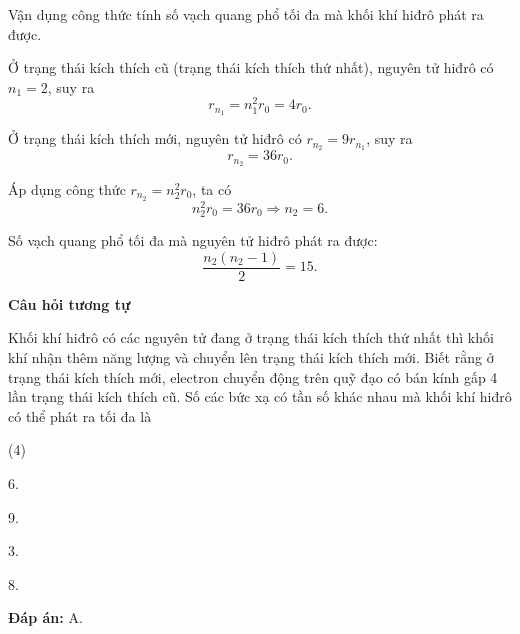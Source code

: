 \begin{dang}{Vận dụng công thức tính số vạch quang phổ tối đa mà khối khí hiđrô phát ra được.}
{Ở trạng thái kích thích cũ (trạng thái kích thích thứ nhất), nguyên tử hiđrô có $n_1= 2$, suy ra
\begin{equation*}
	r_{n_1} = n_1 ^2 r_0 = 4 r_0.
\end{equation*}

Ở trạng thái kích thích mới, nguyên tử hiđrô có $r_{n_2} = 9 r_{n_1}$, suy ra
\begin{equation*}
	r_{n _2} = 36 r_0.
\end{equation*}

Áp dụng công thức $r_{n_2} = n _2 ^2 r_0$, ta có
\begin{equation*}
	n _2 ^2 r_0 = 36 r_0 \Rightarrow n _2 = 6 .
\end{equation*}

Số vạch quang phổ tối đa mà nguyên tử hiđrô phát ra được:
\begin{equation*}
	\dfrac{n_2(n_2-1)}{2}=15.
\end{equation*}

	\begin{center}
	\textbf{Câu hỏi tương tự}
	\end{center}
	
Khối khí hiđrô có các nguyên tử đang ở trạng thái kích thích thứ nhất thì khối khí nhận thêm năng lượng và chuyển lên trạng thái kích thích mới. Biết rằng ở trạng thái kích thích mới, electron chuyển động trên quỹ đạo có bán kính gấp 4 lần trạng thái kích thích cũ. Số các bức xạ có tần số khác nhau mà khối khí hiđrô có thể phát ra tối đa là
\begin{mcq}(4)
	\item 6.
	\item 9.
	\item 3.
	\item 8.
\end{mcq}	
	
	\textbf{Đáp án:} A.
}

\end{dang}




